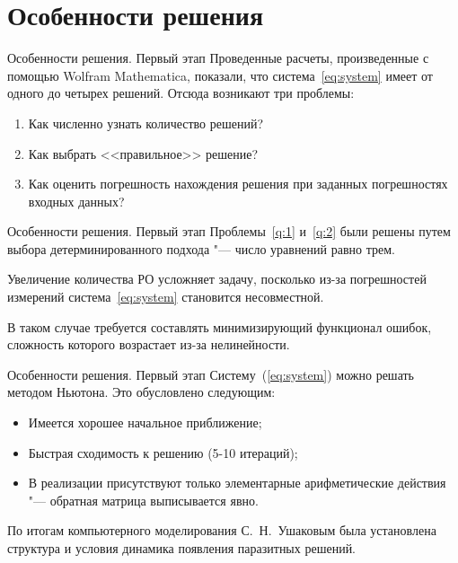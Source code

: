 \documentclass[russian,hyperref={unicode}]{beamer}
\begin{document}
  \section{Особенности решения}
  \begin{frame}{Особенности решения. Первый этап}
    Проведенные расчеты, произведенные с помощью Wolfram Mathematica, показали, что система~\eqref{eq:system} имеет от одного до четырех решений. Отсюда возникают три проблемы:
    \begin{enumerate}
      \item Как численно узнать количество решений? \label{q:1}
      \item Как выбрать <<правильное>> решение? \label{q:2}
      \item Как оценить погрешность нахождения решения при заданных погрешностях входных данных? \label{q:3}
    \end{enumerate}

  \end{frame}

  \begin{frame}{Особенности решения. Первый этап}
    Проблемы~\ref{q:1} и~\ref{q:2} были решены путем выбора детерминированного подхода "--- число уравнений равно трем.

    Увеличение количества РО усложняет задачу, посколько из-за погрешностей измерений система~\eqref{eq:system} становится несовместной.

    В таком случае требуется составлять минимизирующий функционал ошибок, сложность которого возрастает из-за нелинейности.
  \end{frame}

  \begin{frame}{Особенности решения. Первый этап}
    Систему~(\ref{eq:system}) можно решать методом Ньютона. Это обусловлено следующим:
    \begin{itemize}
      \item Имеется хорошее начальное приближение;
      \item Быстрая сходимость к решению (5-10 итераций);
      \item В реализации присутствуют только элементарные арифметические действия "--- обратная матрица выписывается явно.
    \end{itemize}

    По итогам компьютерного моделирования С.~Н.~Ушаковым была установлена структура и условия динамика появления паразитных решений.
  \end{frame}
\end{document}
